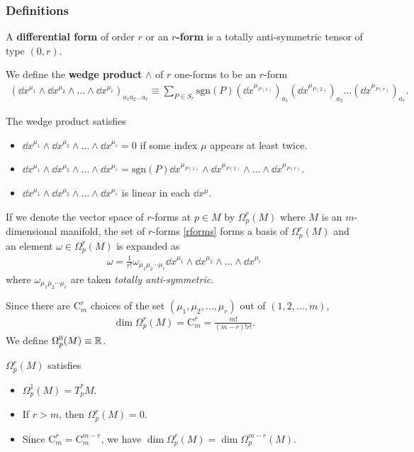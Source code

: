 \documentclass[10pt]{article}
\begin{document}
\subsubsection{Definitions}
\begin{definition}
    A \textbf{differential form} of order $r$ or an \textbf{$r$-form} is a totally anti-symmetric tensor of type $(0,r)$.
\end{definition}
We define the \textbf{wedge product} $\wedge$ of $r$ one-forms to be an $r$-form
\begin{align}\label{rforms}
    (\dd{x}^{\mu_1}\wedge\dd{x}^{\mu_2}\wedge\dots\wedge\dd{x}^{\mu_r})_{a_1 a_2\dots a_r}\equiv\sum_{P\in S_r}\text{sgn}(P)(\dd{x}^{\mu_{P(1)}})_{a_1}(\dd{x}^{\mu_{P(2)}})_{a_2}\dots(\dd{x}^{\mu_{P(r)}})_{a_r}.
\end{align}
\begin{property}
    The wedge product satisfies
    \begin{itemize}
        \item $\dd{x}^{\mu_1}\wedge\dd{x}^{\mu_2}\wedge\dots\wedge\dd{x}^{\mu_r}=0$ if some index $\mu$ appears at least twice.
        \item $\dd{x}^{\mu_1}\wedge\dd{x}^{\mu_2}\wedge\dots\wedge\dd{x}^{\mu_r}=\text{sgn}(P)\dd{x}^{\mu_{P(1)}}\wedge\dd{x}^{\mu_{P(2)}}\wedge\dots\wedge\dd{x}^{\mu_{P(r)}}$.
        \item $\dd{x}^{\mu_1}\wedge\dd{x}^{\mu_2}\wedge\dots\wedge\dd{x}^{\mu_r}$ is linear in each $\dd{x}^\mu$.
    \end{itemize}
\end{property}

If we denote the vector space of $r$-forms at $p\in M$ by $\Omega^r_p(M)$ where $M$ is an $m$-dimensional manifold, the set of $r$-forms \eqref{rforms} forms a basis of $\Omega^r_p(M)$ and an element $\omega\in\Omega^r_p(M)$ is expanded as
\begin{align}
    \omega=\frac{1}{r!}\omega_{\mu_1\mu_2\cdots\mu_r}\dd{x}^{\mu_1}\wedge\dd{x}^{\mu_2}\wedge\dots\wedge\dd{x}^{\mu_r}
\end{align}
where $\omega_{\mu_1\mu_2\cdots\mu_r}$ are taken \textit{totally anti-symmetric}.

Since there are $\text{C}_m^r$ choices of the set $(\mu_1,\mu_2,\dots,\mu_r)$ out of $(1,2,\dots,m)$,
\begin{align}
    \dim\Omega^r_p(M)=\text{C}_m^r=\frac{m!}{(m-r)!r!}.
\end{align}
We define $\Omega^0_p(M)\equiv\mathbb{R}$.
\begin{property}
    $\Omega^r_p(M)$ satisfies
    \begin{itemize}
        \item $\Omega^1_p(M)=T^*_pM$.
        \item If $r>m$, then $\Omega_p^r(M)=0$.
        \item Since $\text{C}_m^r=\text{C}_m^{m-r}$, we have $\dim\Omega^r_p(M)=\dim\Omega^{m-r}_p(M)$.
    \end{itemize}
\end{property}
\end{document}
